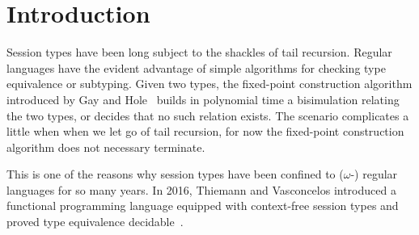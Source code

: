 \section{Introduction}

Session types have been long subject to the shackles of tail
recursion. Regular languages have the evident advantage of simple
algorithms for checking type equivalence or subtyping. Given two
types, the fixed-point construction algorithm introduced by Gay and
Hole~\cite{DBLP:journals/acta/GayH05} builds in polynomial time a
bisimulation relating the two types, or decides that no such relation
exists. The scenario complicates a little when when we let go of tail
recursion, for now the fixed-point construction algorithm does not
necessary terminate.

This is one of the reasons why session types have been confined to
($\omega$-) regular languages for so many years. In 2016, Thiemann and
Vasconcelos introduced a functional programming language equipped with
context-free session types and proved type equivalence
decidable~\cite{DBLP:conf/icfp/ThiemannV16}.

